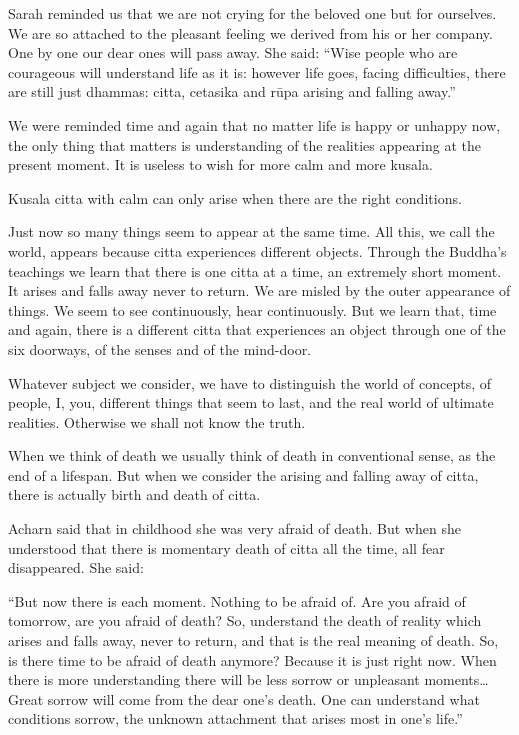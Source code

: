 Sarah reminded us that we are not crying for the beloved one but for
ourselves. We are so attached to the pleasant feeling we derived from
his or her company. One by one our dear ones will pass away. She said:
``Wise people who are courageous will understand life as it is: however
life goes, facing difficulties, there are still just dhammas: citta,
cetasika and rūpa arising and falling away.''

We were reminded time and again that no matter life is happy or unhappy
now, the only thing that matters is understanding of the realities
appearing at the present moment. It is useless to wish for more calm and
more kusala.

Kusala citta with calm can only arise when there are the right
conditions.

Just now so many things seem to appear at the same time. All this, we
call the world, appears because citta experiences different objects.
Through the Buddha's teachings we learn that there is one citta at a
time, an extremely short moment. It arises and falls away never to
return. We are misled by the outer appearance of things. We seem to see
continuously, hear continuously. But we learn that, time and again,
there is a different citta that experiences an object through one of the
six doorways, of the senses and of the mind-door.

Whatever subject we consider, we have to distinguish the world of
concepts, of people, I, you, different things that seem to last, and the
real world of ultimate realities. Otherwise we shall not know the truth.

When we think of death we usually think of death in conventional sense,
as the end of a lifespan. But when we consider the arising and falling
away of citta, there is actually birth and death of citta.

Acharn said that in childhood she was very afraid of death. But when she
understood that there is momentary death of citta all the time, all fear
disappeared. She said:

``But now there is each moment. Nothing to be afraid of. Are you afraid
of tomorrow, are you afraid of death? So, understand the death
of reality which arises and falls away, never to return, and that is the
real meaning of death. So, is there time to be afraid of death anymore?
Because it is just right now. When there is more understanding there
will be less sorrow or unpleasant moments\ldots{} Great sorrow will come
from the dear one's death. One can understand what conditions sorrow,
the unknown attachment that arises most in one's life.''

